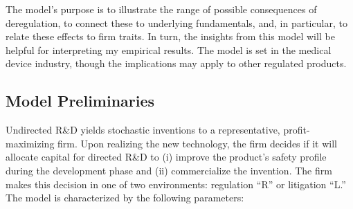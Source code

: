 \documentclass[letterpaper,12pt]{article}
\theoremstyle{definition}
\begin{document}
The model's purpose is to illustrate the range of possible consequences of deregulation, to connect these to underlying fundamentals, and, in particular, to relate these effects to firm traits. In turn, the insights from this model will be helpful for interpreting my empirical results. The model is set in the medical device industry, though the implications may apply to other regulated products.


\subsection{Model Preliminaries}\label{sec:Concept_prelim}

Undirected R\&D yields stochastic inventions to a representative, profit-maximizing firm. Upon realizing the new technology, the firm decides if it will allocate capital for directed R\&D to (i) improve the product's safety profile during the development phase and (ii) commercialize the invention. The firm makes this decision in one of two environments: regulation ``R'' or litigation ``L.'' 
The model is characterized by the following parameters:


\vspace{10pt}
\end{document}
